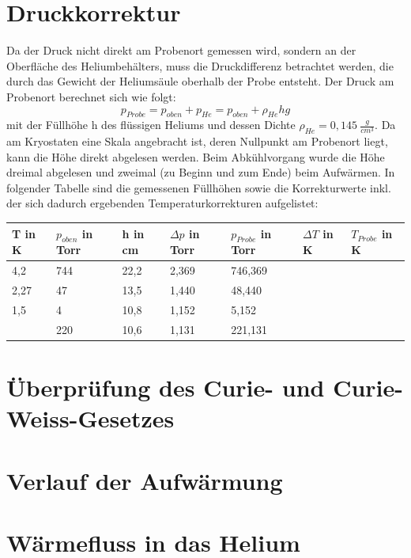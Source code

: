\documentclass[bigchapter,colorback,accentcolor=tud4b,linedtoc,11pt]{tudreport}
\begin{document}
\section{Druckkorrektur}

Da der Druck nicht direkt am Probenort gemessen wird, sondern an der Oberfläche des Heliumbehälters, muss die Druckdifferenz betrachtet werden, die durch das Gewicht der Heliumsäule oberhalb der Probe entsteht. Der Druck am Probenort berechnet sich wie folgt: 
$$p_{Probe} = p_{oben} + p_{He} = p_{oben} + \rho_{He} h g$$
mit der Füllhöhe h des flüssigen Heliums und dessen Dichte $\rho_{He} = 0,145 ~ \frac{g}{cm^3}$. Da am Kryostaten eine Skala angebracht ist, deren Nullpunkt am Probenort liegt, kann die Höhe direkt abgelesen werden. Beim Abkühlvorgang wurde die Höhe dreimal abgelesen und zweimal (zu Beginn und zum Ende) beim Aufwärmen. In folgender Tabelle sind die gemessenen Füllhöhen sowie die Korrekturwerte inkl. der sich dadurch ergebenden Temperaturkorrekturen aufgelistet:

\begin{center}
  \begin{tabular}{|p{1.6cm}|p{2.4cm}|p{1.6cm}|p{2cm}|p{2.4cm}|p{2cm}|p{2cm}|}
    \hline
    T in K & $p_{oben}$ in Torr & h in cm & $\Delta p$ in Torr & $p_{Probe}$ in Torr & $\Delta T$ in K & $T_{Probe}$ in K \\ \hline
    4,2 & 744 & 22,2 & 2,369 & 746,369 &  &   \\ \hline
    2,27 & 47 & 13,5 & 1,440 & 48,440 &  &    \\ \hline
    1,5 & 4 & 10,8 & 1,152 & 5,152 &  &    \\ \hline
     & 220 & 10,6 & 1,131 & 221,131 &  &    \\ \hline
	\end{tabular}
\end{center}

\section{Überprüfung des Curie- und Curie-Weiss-Gesetzes}

\section{Verlauf der Aufwärmung}

\section{Wärmefluss in das Helium}
\end{document}
